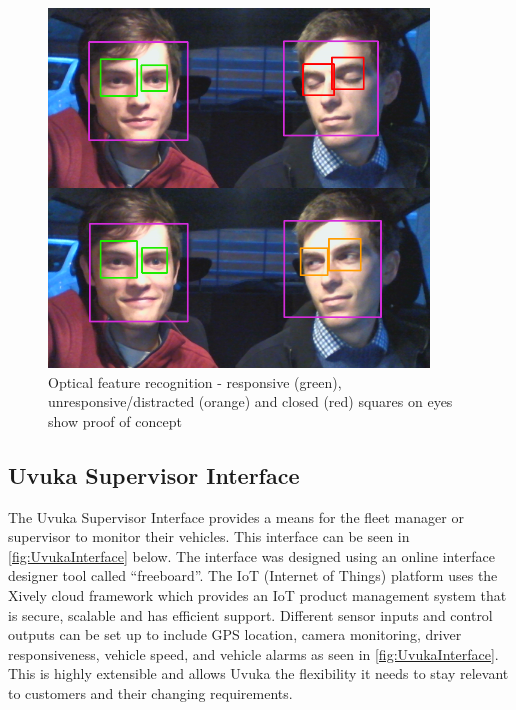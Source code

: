 \begin{figure}[H]
\centering
\includegraphics[width=0.9\textwidth]{images/ocv}
\vskip10pt
\caption[Optical feature recognition]{Optical feature recognition - responsive (green), unresponsive/distracted (orange) and closed (red) squares on eyes show proof of concept}
\label{fig:OpticalFeature}
\end{figure}

\newpage
\subsection{Uvuka Supervisor Interface}
The Uvuka Supervisor Interface provides a means for the fleet manager or supervisor to monitor their vehicles. This interface can be seen in \cref{fig:UvukaInterface} below. The interface was designed using an online interface designer tool called ``freeboard''. The IoT (Internet of Things) platform uses the Xively cloud framework which provides an IoT  product management system that is secure, scalable and has efficient support. Different sensor inputs and control outputs can be set up to include GPS location, camera monitoring, driver responsiveness, vehicle speed, and vehicle alarms as seen in \cref{fig:UvukaInterface}. This is highly extensible and allows Uvuka the flexibility it needs to stay relevant to customers and their changing requirements.

